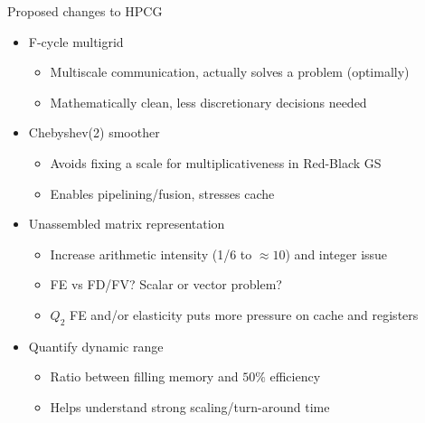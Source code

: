 \documentclass{beamer}
\begin{document}
\begin{frame}{Proposed changes to HPCG}
  \begin{itemize}
  \item F-cycle multigrid
    \begin{itemize}
    \item Multiscale communication, actually solves a problem (optimally)
    \item Mathematically clean, less discretionary decisions needed
    \end{itemize}
  \item Chebyshev(2) smoother
    \begin{itemize}
    \item Avoids fixing a scale for multiplicativeness in Red-Black GS
    \item Enables pipelining/fusion, stresses cache
    \end{itemize}
  \item Unassembled matrix representation
    \begin{itemize}
    \item Increase arithmetic intensity (1/6 to $\approx 10$) and integer issue
    \item FE vs FD/FV?  Scalar or vector problem?
    \item $Q_2$ FE and/or elasticity puts more pressure on cache and registers
    \end{itemize}
  \item Quantify dynamic range
    \begin{itemize}
    \item Ratio between filling memory and $50\%$ efficiency
    \item Helps understand strong scaling/turn-around time
    \end{itemize}
  \end{itemize}
\end{frame}
\end{document}
